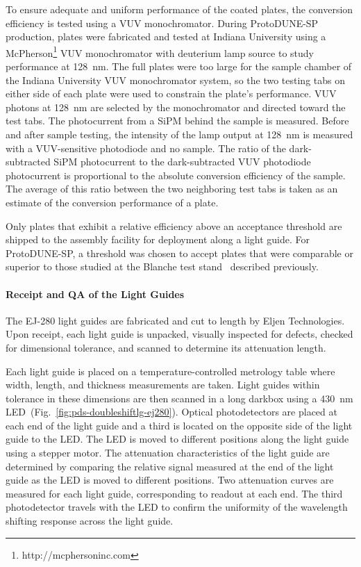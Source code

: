 To ensure adequate and uniform performance of the coated plates, the conversion efficiency is tested using a VUV monochromator. During ProtoDUNE-SP production, plates were fabricated and tested at Indiana University using a McPherson\footnote{http://mcphersoninc.com} VUV monochromator with deuterium lamp source to study performance at 128~nm. The full plates were too large for the sample chamber of the Indiana University VUV monochromator system, so the two testing tabs on either side of each plate were used to constrain the plate's performance. VUV photons at 128~nm are selected by the monochromator and directed toward the test tabs. The photocurrent from a SiPM behind the sample is measured. Before and after sample testing, the intensity of the lamp output at 128~nm is measured with a VUV-sensitive photodiode and no sample. The ratio of the dark-subtracted SiPM photocurrent to the dark-subtracted VUV photodiode photocurrent is proportional to the absolute conversion efficiency of the sample. The average of this ratio between the two neighboring test tabs is taken as an estimate of the conversion performance of a plate.

Only plates that exhibit a relative efficiency above an acceptance threshold are shipped to the assembly facility for deployment along a light guide. For ProtoDUNE-SP, a threshold was chosen to accept plates that were comparable or superior to those studied at the Blanche test stand~\cite{bib:DoubleShiftLG-NIM-171113} described previously.

\paragraph*{Receipt and QA of the Light Guides}

The EJ-280 light guides are fabricated and cut to length by Eljen Technologies. Upon receipt, each light guide is unpacked, visually inspected for defects, checked for dimensional tolerance, and scanned to determine its attenuation length.

Each light guide is placed on a temperature-controlled metrology table where width, length, and thickness measurements are taken. Light guides within tolerance in these dimensions are then scanned in a long darkbox using a 430~nm LED~(Fig.~\ref{fig:pds-doubleshiftlg-ej280}). Optical photodetectors are placed at each end of the light guide and a third is located on the opposite side of the light guide to the LED. The LED is moved to different positions along the light guide using a stepper motor. The attenuation characteristics of the light guide are determined by comparing the relative signal measured at the end of the light guide as the LED is moved to different positions. Two attenuation curves are measured for each light guide, corresponding to readout at each end. The third photodetector travels with the LED to confirm the uniformity of the wavelength shifting response across the light guide.

